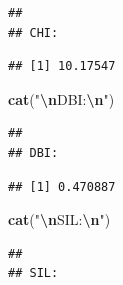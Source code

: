\documentclass[12pt]{article}
\newenvironment{Shaded}{\begin{snugshade}}{\end{snugshade}}
\newcommand{\FunctionTok}[1]{\textcolor[rgb]{0.13,0.29,0.53}{\textbf{#1}}}
\newcommand{\NormalTok}[1]{#1}
\newcommand{\SpecialCharTok}[1]{\textcolor[rgb]{0.81,0.36,0.00}{\textbf{#1}}}
\newcommand{\StringTok}[1]{\textcolor[rgb]{0.31,0.60,0.02}{#1}}
\begin{document}
\begin{verbatim}
## 
## CHI:
\end{verbatim}

\begin{Shaded}
\end{Shaded}

\begin{verbatim}
## [1] 10.17547
\end{verbatim}

\begin{Shaded}
\begin{Highlighting}[]
\FunctionTok{cat}\NormalTok{(}\StringTok{"}\SpecialCharTok{\textbackslash{}n}\StringTok{DBI:}\SpecialCharTok{\textbackslash{}n}\StringTok{"}\NormalTok{)}
\end{Highlighting}
\end{Shaded}

\begin{verbatim}
## 
## DBI:
\end{verbatim}

\begin{Shaded}
\end{Shaded}

\begin{verbatim}
## [1] 0.470887
\end{verbatim}

\begin{Shaded}
\begin{Highlighting}[]
\FunctionTok{cat}\NormalTok{(}\StringTok{"}\SpecialCharTok{\textbackslash{}n}\StringTok{SIL:}\SpecialCharTok{\textbackslash{}n}\StringTok{"}\NormalTok{)}
\end{Highlighting}
\end{Shaded}

\begin{verbatim}
## 
## SIL:
\end{verbatim}

\begin{Shaded}
\end{Shaded}
\end{document}
